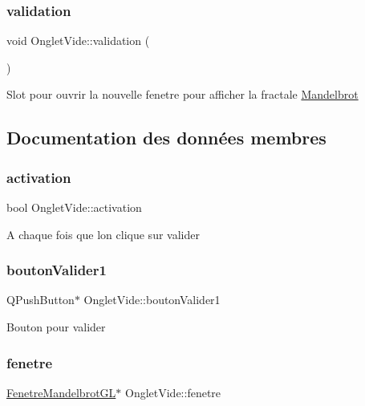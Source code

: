 \subsubsection{\texorpdfstring{validation}{validation}}
{\footnotesize\ttfamily void Onglet\+Vide\+::validation (\begin{DoxyParamCaption}{ }\end{DoxyParamCaption})\hspace{0.3cm}{\ttfamily [slot]}}

Slot pour ouvrir la nouvelle fenetre pour afficher la fractale \hyperlink{classMandelbrot}{Mandelbrot} 

\subsection{Documentation des données membres}
\mbox{\label{classOngletVide_abb27f7ff5e53d2dcf3889ba758ecf182}} 
\subsubsection{\texorpdfstring{activation}{activation}}
{\footnotesize\ttfamily bool Onglet\+Vide\+::activation\hspace{0.3cm}{\ttfamily [private]}}

A chaque fois que l\textquotesingle{}on clique sur valider \mbox{\label{classOngletVide_aa04073ea6bc8d821d9977a1f79869b7e}} 
\subsubsection{\texorpdfstring{bouton\+Valider1}{boutonValider1}}
{\footnotesize\ttfamily Q\+Push\+Button$\ast$ Onglet\+Vide\+::bouton\+Valider1\hspace{0.3cm}{\ttfamily [private]}}

Bouton pour valider \mbox{\label{classOngletVide_ad7d2c25286ebf7213a97e36d0a21a3a6}} 
\subsubsection{\texorpdfstring{fenetre}{fenetre}}
{\footnotesize\ttfamily \hyperlink{classFenetreMandelbrotGL}{Fenetre\+Mandelbrot\+GL}$\ast$ Onglet\+Vide\+::fenetre\hspace{0.3cm}{\ttfamily [private]}}

